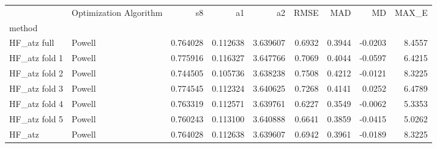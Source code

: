 \begin{tabular}{llrrrrrrr}
 & Optimization Algorithm & s8 & a1 & a2 & RMSE & MAD & MD & MAX_E \\
method &  &  &  &  &  &  &  &  \\
HF_atz full & Powell & 0.764028 & 0.112638 & 3.639607 & 0.6932 & 0.3944 & -0.0203 & 8.4557 \\
HF_atz fold 1 & Powell & 0.775916 & 0.116327 & 3.647766 & 0.7069 & 0.4044 & -0.0597 & 6.4215 \\
HF_atz fold 2 & Powell & 0.744505 & 0.105736 & 3.638238 & 0.7508 & 0.4212 & -0.0121 & 8.3225 \\
HF_atz fold 3 & Powell & 0.774545 & 0.112324 & 3.640625 & 0.7268 & 0.4141 & 0.0252 & 6.4789 \\
HF_atz fold 4 & Powell & 0.763319 & 0.112571 & 3.639761 & 0.6227 & 0.3549 & -0.0062 & 5.3353 \\
HF_atz fold 5 & Powell & 0.760243 & 0.113100 & 3.640888 & 0.6641 & 0.3859 & -0.0415 & 5.0262 \\
HF_atz & Powell & 0.764028 & 0.112638 & 3.639607 & 0.6942 & 0.3961 & -0.0189 & 8.3225 \\
\end{tabular}
